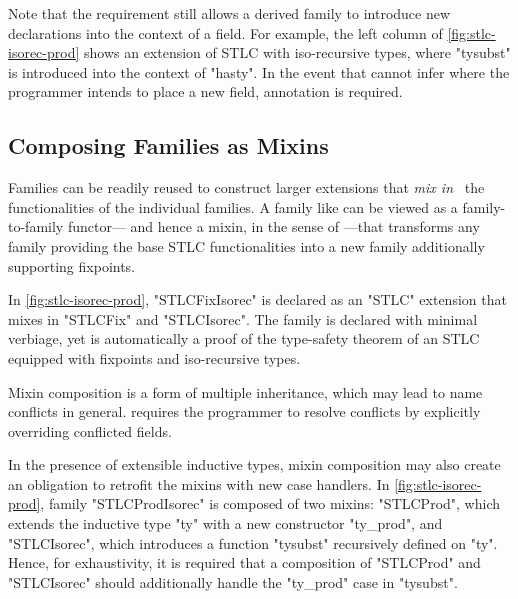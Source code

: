 Note that the requirement still allows a derived family to introduce
new declarations into the context of a field. %
For example, the left column of \cref{fig:stlc-isorec-prod} shows an
extension of STLC with iso-recursive types, where "tysubst" is
introduced into the context of "hasty".
%
In the event that \Lang cannot infer where the programmer intends to place a new field,
annotation is required. 




\subsection{Composing Families as Mixins}


Families can be readily reused to construct larger extensions that
\emph{mix in}~\cite{mixin-1990} the functionalities of the individual
families.
A family like  can be viewed as a family-to-family functor---%
and hence a mixin, in the sense of \cite{flatt1998mixin}---that
transforms any family providing the base STLC functionalities into a new
family additionally supporting fixpoints.

In \cref{fig:stlc-isorec-prod}, "STLCFixIsorec" is declared as
an "STLC" extension that mixes in "STLCFix" and "STLCIsorec".
The family is declared with minimal verbiage, yet
 is automatically a proof of the type-safety
theorem of an STLC equipped with fixpoints and iso-recursive types.

Mixin composition is a form of multiple inheritance, which may lead to
name conflicts in general.
\Lang requires the programmer to resolve conflicts by
explicitly overriding conflicted fields.

In the presence of extensible inductive types, mixin composition may
also create an obligation to retrofit the mixins with new case handlers.
In \cref{fig:stlc-isorec-prod}, family "STLCProdIsorec" is composed
of two mixins: "STLCProd", which extends the inductive type "ty" with a
new constructor "ty_prod", and "STLCIsorec", which introduces a
function "tysubst" recursively defined on "ty".
Hence, for exhaustivity, it is required that a composition of
"STLCProd" and "STLCIsorec" should additionally handle the "ty_prod"
case in "tysubst".

